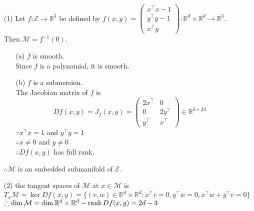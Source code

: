 \documentclass[en, oneside]{assignment}
\begin{document}
\begin{sol}
    \begin{itemize}
        \item[(1)] Let $f: \mathcal{E} \to \mathbb{R}^3$ be defined by $f(x, y) = 
        \begin{pmatrix}x^\top x - 1\\y^\top y - 1\\x^\top y\end{pmatrix}: \mathbb{R}^d \times \mathbb{R}^d \to \mathbb{R}^3$.
        Then $\mathcal{M} = f^{-1}(0)$.
        \begin{itemize}
            \item[(a)] $f$ is smooth.\\
            Since $f$ is a polynomial, it is smooth.
            \item[(b)] $f$ is a submersion.\\
            The Jacobian matrix of $f$ is
            \begin{equation*}
                Df(x, y) = J_f(x, y) = \begin{pmatrix}
                    2x^\top & 0\\
                    0 & 2y^\top\\
                    y^\top & x^\top
                \end{pmatrix} \in \mathbb{R}^{3 \times 2d}
            \end{equation*}
            $\because x^\top x = 1$ and $y^\top y = 1$\\
            $\therefore x \neq 0$ and $y \neq 0$\\
            $\therefore Df(x, y)$ has full rank.
        \end{itemize}
        $\therefore \mathcal{M}$ is an embedded submanifold of $\mathcal{E}$.
        \item[(2)] the tangent spaces of $\mathcal{M}$ at $x \in \mathcal{M}$ is
        \begin{equation*}
            T_x\mathcal{M} = \ker Df(x, y) = \{(v, w) \in \mathbb{R}^d \times \mathbb{R}^d : x^\top v = 0, y^\top w = 0, x^\top w + y^\top v = 0\}
        \end{equation*}
        $\therefore \dim{\mathcal{M}} = \dim{\mathbb{R}^d \times \mathbb{R}^d} - \operatorname{rank}{Df(x, y)} = 2d - 3$
    \end{itemize}
\end{sol}
\end{document}
